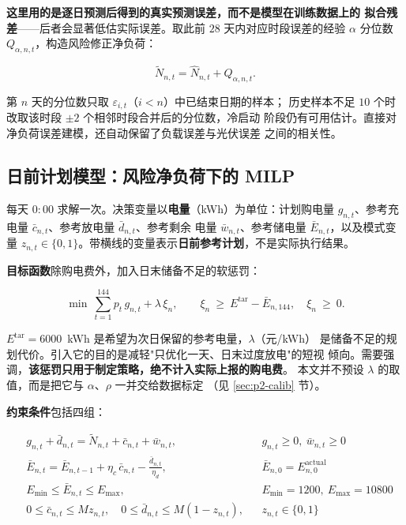 \documentclass[withoutpreface,bwprint]{cumcmthesis}
\begin{document}
\textbf{这里用的是逐日预测后得到的真实预测误差，而不是模型在训练数据上的
拟合残差}——后者会显著低估实际误差。取此前 $28$ 天内对应时段误差的经验
$\alpha$ 分位数 $Q_{\alpha,n,t}$，构造风险修正净负荷：

\begin{equation}
  \widetilde N_{n,t}=\widehat N_{n,t}+Q_{\alpha,n,t} .
  \label{eq:p2-risk}
\end{equation}

第 $n$ 天的分位数只取 $\varepsilon_{i,t}$（$i<n$）中已结束日期的样本；
历史样本不足 $10$ 个时改取该时段 $\pm2$ 个相邻时段合并后的分位数，冷启动
阶段仍有可用估计。直接对净负荷误差建模，还自动保留了负载误差与光伏误差
之间的相关性。

\subsection{日前计划模型：风险净负荷下的 MILP}

每天 $0{:}00$ 求解一次。决策变量以\textbf{电量}（kWh）为单位：计划购电量
$g_{n,t}$、参考充电量 $\bar c_{n,t}$、参考放电量 $\bar d_{n,t}$、参考剩余
电量 $\bar w_{n,t}$、参考储电量 $\bar E_{n,t}$，以及模式变量
$z_{n,t}\in\{0,1\}$。带横线的变量表示\textbf{日前参考计划}，不是实际执行结果。

\textbf{目标函数}除购电费外，加入日末储备不足的软惩罚：

\begin{equation}
  \min\ \sum_{t=1}^{144}p_t\,g_{n,t}+\lambda\,\xi_n,
  \qquad
  \xi_n\ \ge\ E^{\mathrm{tar}}-\bar E_{n,144},\quad \xi_n\ \ge\ 0 .
  \label{eq:p2-obj}
\end{equation}

$E^{\mathrm{tar}}=6000$~kWh 是希望为次日保留的参考电量，$\lambda$（元/kWh）
是储备不足的规划代价。引入它的目的是减轻"只优化一天、日末过度放电"的短视
倾向。需要强调，\textbf{该惩罚只用于制定策略，绝不计入实际上报的购电费}。
本文并不预设 $\lambda$ 的取值，而是把它与 $\alpha$、$\rho$ 一并交给数据标定
（见 \ref{sec:p2-calib} 节）。

\textbf{约束条件}包括四组：

\begin{equation}
\begin{aligned}
  & g_{n,t}+\bar d_{n,t}=\widetilde N_{n,t}+\bar c_{n,t}+\bar w_{n,t},
  && g_{n,t}\ge0,\ \bar w_{n,t}\ge0 \\
  & \bar E_{n,t}=\bar E_{n,t-1}+\eta_c\,\bar c_{n,t}
    -\frac{\bar d_{n,t}}{\eta_d},
  && \bar E_{n,0}=E_{n,0}^{\mathrm{actual}} \\
  & E_{\min}\le\bar E_{n,t}\le E_{\max},
  && E_{\min}=1200,\ E_{\max}=10800 \\
  & 0\le\bar c_{n,t}\le M z_{n,t},\quad
    0\le\bar d_{n,t}\le M(1-z_{n,t}),
  && z_{n,t}\in\{0,1\}
\end{aligned}
\label{eq:p2-model}
\end{equation}
\end{document}
